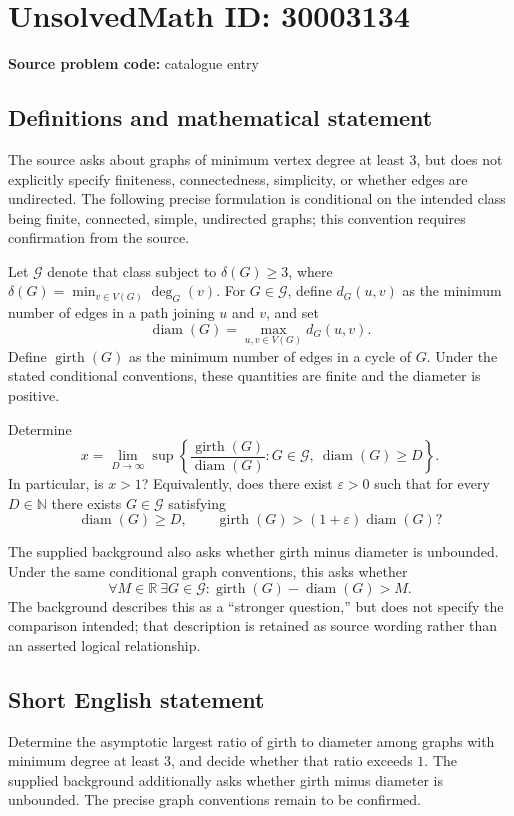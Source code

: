 \documentclass[11pt]{article}
\newcommand{\N}{\mathbb{N}}
\newcommand{\R}{\mathbb{R}}
\begin{document}
\section*{UnsolvedMath ID: 30003134}
\textbf{Source problem code:} catalogue entry
\subsection{Definitions and mathematical statement}
The source asks about graphs of minimum vertex degree at least \(3\), but does not explicitly specify finiteness, connectedness, simplicity, or whether edges are undirected. The following precise formulation is conditional on the intended class being finite, connected, simple, undirected graphs; this convention requires confirmation from the source.

Let \(\mathcal G\) denote that class subject to \(\delta(G)\geq 3\), where \(\delta(G)=\min_{v\in V(G)}\deg_G(v)\). For \(G\in\mathcal G\), define \(d_G(u,v)\) as the minimum number of edges in a path joining \(u\) and \(v\), and set
\[
\operatorname{diam}(G)=\max_{u,v\in V(G)}d_G(u,v).
\]
Define \(\operatorname{girth}(G)\) as the minimum number of edges in a cycle of \(G\). Under the stated conditional conventions, these quantities are finite and the diameter is positive.

Determine
\[
x=\lim_{D\to\infty}\sup\left\{\frac{\operatorname{girth}(G)}{\operatorname{diam}(G)}:G\in\mathcal G,\ \operatorname{diam}(G)\geq D\right\}.
\]
In particular, is \(x>1\)? Equivalently, does there exist \(\varepsilon>0\) such that for every \(D\in\N\) there exists \(G\in\mathcal G\) satisfying
\[
\operatorname{diam}(G)\geq D,
\qquad
\operatorname{girth}(G)>(1+\varepsilon)\operatorname{diam}(G)?
\]

The supplied background also asks whether girth minus diameter is unbounded. Under the same conditional graph conventions, this asks whether
\[
\forall M\in\R\ \exists G\in\mathcal G:
\operatorname{girth}(G)-\operatorname{diam}(G)>M.
\]
The background describes this as a ``stronger question,'' but does not specify the comparison intended; that description is retained as source wording rather than an asserted logical relationship.
\subsection{Short English statement}
Determine the asymptotic largest ratio of girth to diameter among graphs with minimum degree at least \(3\), and decide whether that ratio exceeds \(1\). The supplied background additionally asks whether girth minus diameter is unbounded. The precise graph conventions remain to be confirmed.
\end{document}
